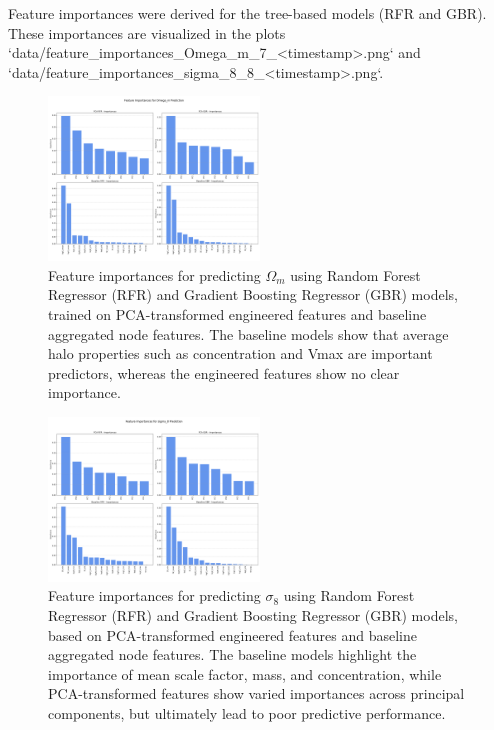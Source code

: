 \documentclass[twocolumn]{aastex631}
\begin{document}
Feature importances were derived for the tree-based models (RFR and GBR). These importances are visualized in the plots `data/feature_importances_Omega_m_7_<timestamp>.png` and `data/feature_importances_sigma_8_8_<timestamp>.png`.

\begin{figure}[h!]
    \centering
    \includegraphics[width=0.5\textwidth]{../input_files/plots/feature_importances_Omega_m_7_20250527-135752.png}
    \caption{Feature importances for predicting $\Omega_m$ using Random Forest Regressor (RFR) and Gradient Boosting Regressor (GBR) models, trained on PCA-transformed engineered features and baseline aggregated node features. The baseline models show that average halo properties such as concentration and Vmax are important predictors, whereas the engineered features show no clear importance.}
    \label{fig:feature_importances_omega_m}
\end{figure}

\begin{figure}[h!]
    \centering
    \includegraphics[width=0.5\textwidth]{../input_files/plots/feature_importances_sigma_8_8_20250527-135752.png}
    \caption{Feature importances for predicting $\sigma_8$ using Random Forest Regressor (RFR) and Gradient Boosting Regressor (GBR) models, based on PCA-transformed engineered features and baseline aggregated node features. The baseline models highlight the importance of mean scale factor, mass, and concentration, while PCA-transformed features show varied importances across principal components, but ultimately lead to poor predictive performance.}
    \label{fig:feature_importances_sigma_8}
\end{figure}
\end{document}
